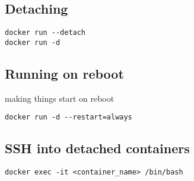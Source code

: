 

\subsection{Detaching}
\begin{verbatim}
docker run --detach
docker run -d
\end{verbatim}
\subsection{Running on reboot}

making things start on reboot
\begin{verbatim}
docker run -d --restart=always
\end{verbatim}
\subsection{SSH into detached containers}

\begin{verbatim}
docker exec -it <container_name> /bin/bash
\end{verbatim}
